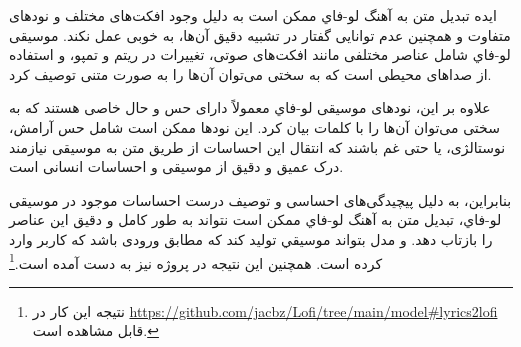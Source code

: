 ایده تبدیل متن به آهنگ ﻟﻮ-ﻓﺎﻱ  ممکن است به دلیل وجود افکت‌های مختلف و نودهای متفاوت و همچنین عدم توانایی گفتار در تشبیه دقیق آن‌ها، به خوبی عمل نکند. موسیقی ﻟﻮ-ﻓﺎﻱ شامل عناصر مختلفی مانند افکت‌های صوتی، تغییرات در ریتم و تمپو، و استفاده از صداهای محیطی است که به سختی می‌توان آن‌ها را به صورت متنی توصیف کرد.

علاوه بر این، نودهای موسیقی ﻟﻮ-ﻓﺎﻱ معمولاً دارای حس و حال خاصی هستند که به سختی می‌توان آن‌ها را با کلمات بیان کرد. این نودها ممکن است شامل حس آرامش، نوستالژی، یا حتی غم باشند که انتقال این احساسات از طریق متن به موسیقی نیازمند درک عمیق و دقیق از موسیقی و احساسات انسانی است.

بنابراین، به دلیل پیچیدگی‌های احساسی و توصیف درست احساسات موجود در موسیقی ﻟﻮ-ﻓﺎﻱ، تبدیل متن به آهنگ ﻟﻮ-ﻓﺎﻱ ممکن است نتواند به طور کامل و دقیق این عناصر را بازتاب دهد. و مدل بتواند موسیقي تولید کند که مطابق ورودی باشد که کاربر وارد کرده است. همچنین این نتیجه در پروژه  \cite{Zhang} نیز به دست آمده است.\footnote{نتیجه این کار در \url{https://github.com/jacbz/Lofi/tree/main/model\#lyrics2lofi} قابل مشاهده است.}
